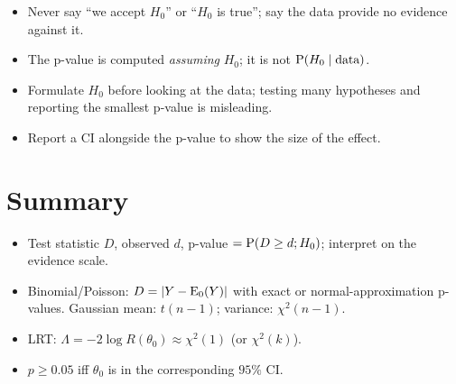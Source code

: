 \begin{important}
\begin{itemize}
  \item Never say ``we accept $H_0$'' or ``$H_0$ is true''; say the data provide no
        evidence against it.
  \item The p-value is computed \emph{assuming} $H_0$; it is not $\operatorname{P}(H_0\mid\text{data})$.
  \item Formulate $H_0$ before looking at the data; testing many hypotheses and reporting
        the smallest p-value is misleading.
  \item Report a CI alongside the p-value to show the size of the effect.
\end{itemize}
\end{important}

\section*{Summary}
\begin{itemize}
  \item Test statistic $D$, observed $d$, p-value $=\operatorname{P}(D\ge d;H_0)$; interpret on the
        evidence scale.
  \item Binomial/Poisson: $D = |Y-\operatorname{E}_0(Y)|$ with exact or normal-approximation
        p-values. Gaussian mean: $t(n-1)$; variance: $\chi^2(n-1)$.
  \item LRT: $\Lambda = -2\log R(\theta_0)\approx\chi^2(1)$ (or $\chi^2(k)$).
  \item $p\ge 0.05$ iff $\theta_0$ is in the corresponding $95\%$ CI.
\end{itemize}
